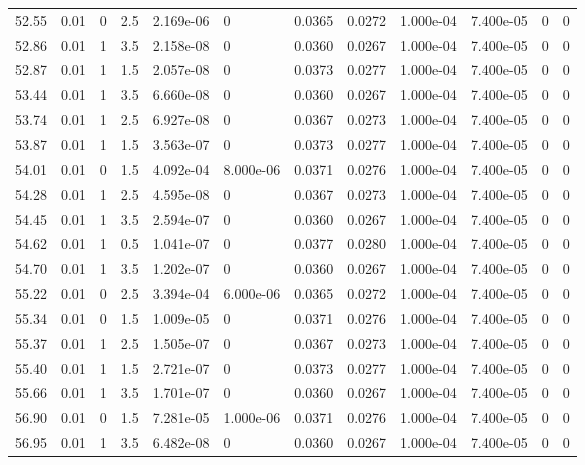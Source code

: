 \documentclass[preview]{standalone}
\begin{document}
{{{{{{\begin{tabular}{L{1.2cm}C{1.2cm} C{0.3cm}C{0.5cm} C{1.4cm}C{1.4cm} C{1.4cm}C{1.4cm} C{1.6cm}C{1.6cm} C{1.6cm}C{1.6cm}}
  52.55  &  0.01  & 0     & 2.5 &  2.169e-06  & 0  &  0.0365&   0.0272& 1.000e-04 & 7.400e-05   &  0 & 0  \\ 
  52.86  &  0.01  & 1     & 3.5 &  2.158e-08  & 0  &  0.0360&   0.0267& 1.000e-04 & 7.400e-05   &  0 & 0  \\ 
  52.87  &  0.01  & 1     & 1.5 &  2.057e-08  & 0  &  0.0373&   0.0277& 1.000e-04 & 7.400e-05   &  0 & 0  \\ 
  53.44  &  0.01  & 1     & 3.5 &  6.660e-08  & 0  &  0.0360&   0.0267& 1.000e-04 & 7.400e-05   &  0 & 0  \\ 
  53.74  &  0.01  & 1     & 2.5 &  6.927e-08  & 0  &  0.0367&   0.0273& 1.000e-04 & 7.400e-05   &  0 & 0  \\ 
  53.87  &  0.01  & 1     & 1.5 &  3.563e-07  & 0  &  0.0373&   0.0277& 1.000e-04 & 7.400e-05   &  0 & 0  \\ 
  54.01  &  0.01  & 0     & 1.5 &  4.092e-04  & 8.000e-06  &  0.0371&   0.0276& 1.000e-04 & 7.400e-05   &  0 & 0  \\ 
  54.28  &  0.01  & 1     & 2.5 &  4.595e-08  & 0  &  0.0367&   0.0273& 1.000e-04 & 7.400e-05   &  0 & 0  \\ 
  54.45  &  0.01  & 1     & 3.5 &  2.594e-07  & 0  &  0.0360&   0.0267& 1.000e-04 & 7.400e-05   &  0 & 0  \\ 
  54.62  &  0.01  & 1     & 0.5 &  1.041e-07  & 0  &  0.0377&   0.0280& 1.000e-04 & 7.400e-05   &  0 & 0  \\ 
  54.70  &  0.01  & 1     & 3.5 &  1.202e-07  & 0  &  0.0360&   0.0267& 1.000e-04 & 7.400e-05   &  0 & 0  \\ 
  55.22  &  0.01  & 0     & 2.5 &  3.394e-04  & 6.000e-06  &  0.0365&   0.0272& 1.000e-04 & 7.400e-05   &  0 & 0  \\ 
  55.34  &  0.01  & 0     & 1.5 &  1.009e-05  & 0  &  0.0371&   0.0276& 1.000e-04 & 7.400e-05   &  0 & 0  \\ 
  55.37  &  0.01  & 1     & 2.5 &  1.505e-07  & 0  &  0.0367&   0.0273& 1.000e-04 & 7.400e-05   &  0 & 0  \\ 
  55.40  &  0.01  & 1     & 1.5 &  2.721e-07  & 0  &  0.0373&   0.0277& 1.000e-04 & 7.400e-05   &  0 & 0  \\ 
  55.66  &  0.01  & 1     & 3.5 &  1.701e-07  & 0  &  0.0360&   0.0267& 1.000e-04 & 7.400e-05   &  0 & 0  \\ 
  56.90  &  0.01  & 0     & 1.5 &  7.281e-05  & 1.000e-06  &  0.0371&   0.0276& 1.000e-04 & 7.400e-05   &  0 & 0  \\ 
  56.95  &  0.01  & 1     & 3.5 &  6.482e-08  & 0  &  0.0360&   0.0267& 1.000e-04 & 7.400e-05   &  0 & 0  \\ 

\end{tabular}}}}}}}
\end{document}
